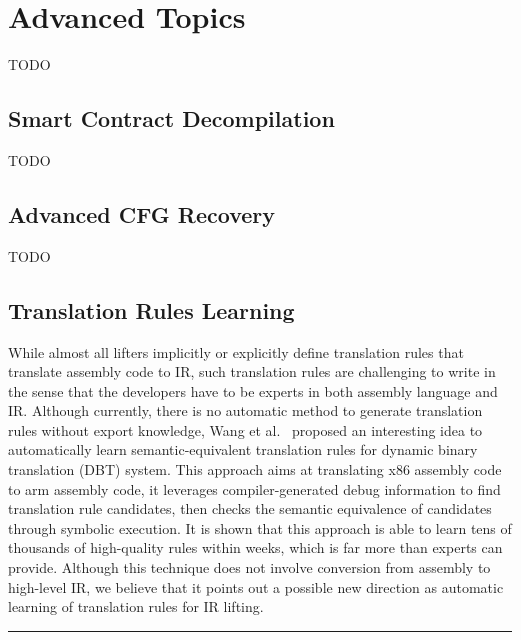 \chapter{Advanced Topics}\label{sec-advanced}
TODO

\section{Smart Contract Decompilation}\label{sec:advanced-contract}
TODO

\section{Advanced CFG Recovery}\label{sec:advanced-cfg}
TODO

\section{Translation Rules Learning} \label{sec:advanced-rules}
While almost all lifters implicitly or explicitly define translation rules that translate assembly code to IR, such translation rules are challenging to write in the sense that the developers have to be experts in both assembly language and IR. Although currently, there is no automatic method to generate translation rules without export knowledge, Wang et al.~\cite{wang2018enhancing,song2019unleashing} proposed an interesting idea to automatically learn semantic-equivalent translation rules for dynamic binary translation (DBT) system.
%
This approach aims at translating x86 assembly code to arm assembly code, it leverages compiler-generated debug information to find translation rule candidates, then checks the semantic equivalence of candidates through symbolic execution. It is shown that this approach is able to learn tens of thousands of high-quality rules within weeks, which is far more than experts can provide. Although this technique does not involve conversion from assembly to high-level IR, we believe that it points out a possible new direction as automatic learning of translation rules for IR lifting.

\noindent\rule{8cm}{0.4pt}

\newpage
